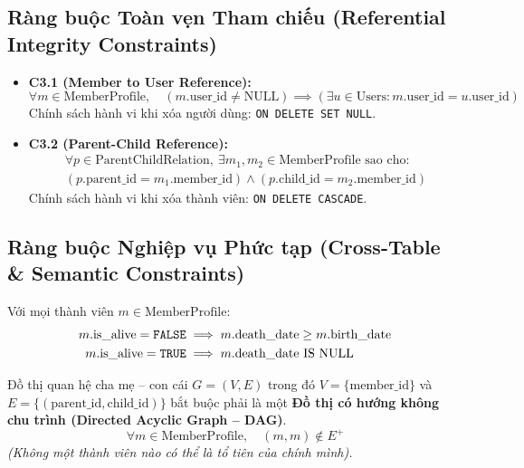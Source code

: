 \subsection{Ràng buộc Toàn vẹn Tham chiếu (Referential Integrity Constraints)}
\label{subsec:2_4_3_referential}

\begin{itemize}
    \item \textbf{C3.1 (Member to User Reference):}
    \[
    \forall m \in \text{MemberProfile}, \quad (m.\text{user\_id} \neq \text{NULL}) \implies (\exists u \in \text{Users}: m.\text{user\_id} = u.\text{user\_id})
    \]
    Chính sách hành vi khi xóa người dùng: \texttt{ON DELETE SET NULL}.

    \item \textbf{C3.2 (Parent-Child Reference):}
    \[
    \begin{aligned}
    \forall p \in \text{ParentChildRelation}, \ \exists m_1, m_2 \in \text{MemberProfile} \text{ sao cho: } \\
    (p.\text{parent\_id} = m_1.\text{member\_id}) \land (p.\text{child\_id} = m_2.\text{member\_id})
    \end{aligned}
    \]
    Chính sách hành vi khi xóa thành viên: \texttt{ON DELETE CASCADE}.
\end{itemize}

\subsection{Ràng buộc Nghiệp vụ Phức tạp (Cross-Table \& Semantic Constraints)}
\label{subsec:2_4_4_semantic}

\begin{definition}
Với mọi thành viên $m \in \text{MemberProfile}$:
\[
\begin{aligned}
m.\text{is\_alive} = \text{\texttt{FALSE}} &\implies m.\text{death\_date} \ge m.\text{birth\_date} \\
m.\text{is\_alive} = \text{\texttt{TRUE}}  &\implies m.\text{death\_date} \text{ IS NULL}
\end{aligned}
\]
\end{definition}

\begin{definition}
Đồ thị quan hệ cha mẹ -- con cái $G = (V, E)$ trong đó $V = \{\text{member\_id}\}$ và $E = \{(\text{parent\_id}, \text{child\_id})\}$ bắt buộc phải là một \textbf{Đồ thị có hướng không chu trình (Directed Acyclic Graph -- DAG)}.
\[
\forall m \in \text{MemberProfile}, \quad (m, m) \notin E^+
\]
\textit{(Không một thành viên nào có thể là tổ tiên của chính mình).}
\end{definition}

